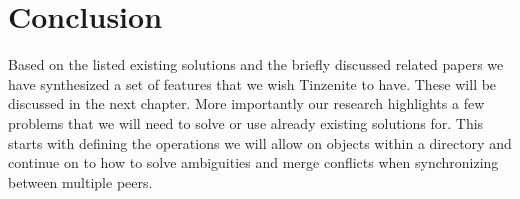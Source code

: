 \section{Conclusion}
\label{sec:Conclusion}

Based on the listed existing solutions and the briefly discussed related papers we have synthesized a set of features that we wish Tinzenite to have.
These will be discussed in the next chapter.
More importantly our research highlights a few problems that we will need to solve or use already existing solutions for.
This starts with defining the operations we will allow on objects within a directory and continue on to how to solve ambiguities and merge conflicts when synchronizing between multiple peers.
